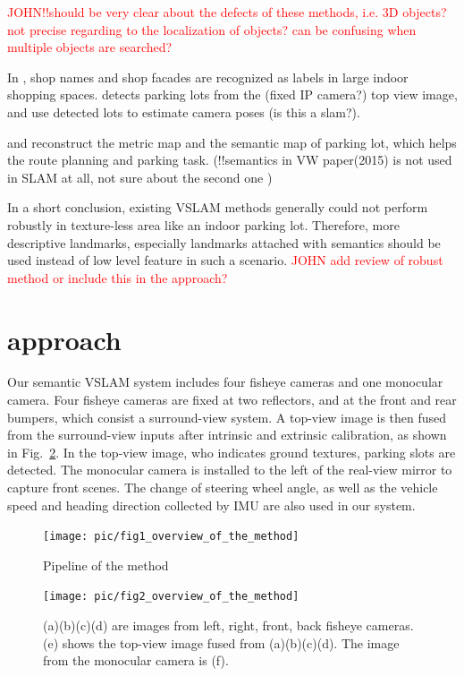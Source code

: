 \documentclass[journal]{IEEEtran}
\newcommand{\Reffig}[1]{Fig.~\ref{#1}}
\newcommand{\COMMENT}[1]{\textcolor{red}{#1}}
\begin{document}
\COMMENT{JOHN!!should be very clear about the defects of these methods, i.e. 3D objects? not precise regarding to the localization of objects? can be confusing when multiple objects are searched?}

In \cite{Wang2015Lost}, shop names and shop facades are recognized as labels in large indoor shopping spaces. 
\cite{Houben:2015hq} detects parking lots from the (fixed IP camera?) top view image, and use detected lots to estimate camera poses (is this a slam?).

\cite{Grimmett2015Integrating} and \cite{Himstedt2017Online} reconstruct the metric map and the semantic map of parking lot, which helps the route planning and parking task.
(!!semantics in VW paper(2015) is not used in SLAM at all, not sure about the second one )

In a short conclusion, existing VSLAM methods generally could not perform robustly in texture-less area like an indoor parking lot.
Therefore, more descriptive landmarks, especially landmarks attached with semantics should be used instead of low level feature in such a scenario.
\COMMENT{JOHN add review of robust method or include this in the approach?}
\section{approach}

Our semantic VSLAM system includes four fisheye cameras and one monocular camera. 
Four fisheye cameras are fixed at two reflectors, and at the front and rear bumpers, which consist a surround-view system. 
A top-view image is then fused from the surround-view inputs after intrinsic and extrinsic calibration, as shown in \Reffig{fig:2}. 
In the top-view image, who indicates ground textures, parking slots are detected. 
The monocular camera is installed to the left of the real-view mirror to capture front scenes. 
The change of steering wheel angle, as well as the vehicle speed and heading direction collected by IMU are also used in our system.

\begin{figure}[htbp]
\centering
\texttt{[image: pic/fig1\_overview\_of\_the\_method]}
\caption{Pipeline of the method}\label{fig:1}
\end{figure}

\begin{figure}
\centering
\texttt{[image: pic/fig2\_overview\_of\_the\_method]}
\caption{
(a)(b)(c)(d) are images from left, right, front, back fisheye cameras. 
(e) shows the top-view image fused from (a)(b)(c)(d). The image from the monocular camera is (f). 
}\label{fig:2}
\end{figure}
\end{document}
